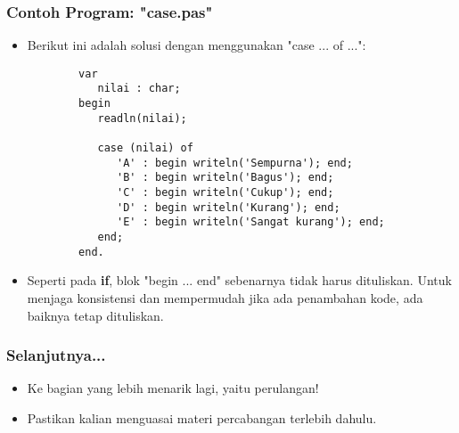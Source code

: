 \documentclass{beamer}
\begin{document}
\begin{frame}[fragile]
\frametitle{Contoh Program: "case.pas"}
\begin{itemize}
	\item Berikut ini adalah solusi dengan menggunakan "case ... of ...":
	\begin{lstlisting}
		var
		   nilai : char;
		begin
		   readln(nilai);
		
		   case (nilai) of
		      'A' : begin writeln('Sempurna'); end;
		      'B' : begin writeln('Bagus'); end;
		      'C' : begin writeln('Cukup'); end;
		      'D' : begin writeln('Kurang'); end;
		      'E' : begin writeln('Sangat kurang'); end;
		   end;
		end.
	\end{lstlisting}
	\item Seperti pada \textbf{if}, blok "begin ... end" sebenarnya tidak harus dituliskan. Untuk menjaga konsistensi dan mempermudah \newline jika ada penambahan kode, ada baiknya tetap dituliskan.
\end{itemize}
\end{frame}

\begin{frame}
\frametitle{Selanjutnya...}
\begin{itemize}
	\item Ke bagian yang lebih menarik lagi, yaitu perulangan!
	\item Pastikan kalian menguasai materi percabangan terlebih dahulu.
\end{itemize}
\end{frame}
\end{document}
